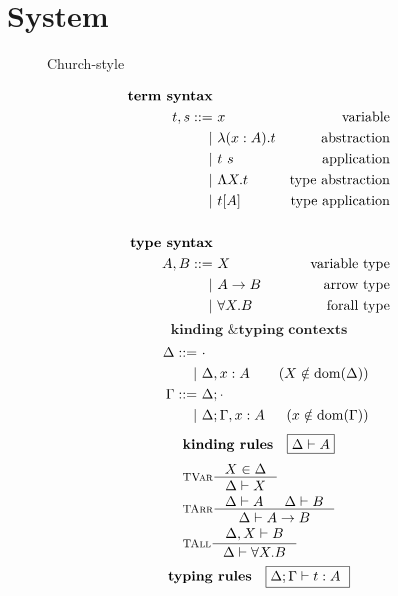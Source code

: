 \section{System \F} \label{sec:f}
\begin{figure}
\begin{singlespace}
\begin{minipage}{.46\textwidth}
	\begin{center}Church-style\end{center}
\def\baselinestretch{0}
\small
\begin{align*}
\textbf{term syntax} \\
t,s ::= &~ x           & \text{variable}    \\
      | &~ \lambda(x:A) . t & \text{abstraction} \\
      | &~ t ~ s       & \text{application} \\
      | &~ \Lambda X    . t & \text{type abstraction} \\
      | &~ t [A]       & \text{type application} \\
\\
\textbf{type syntax} \\
A,B ::= &~ X           & \text{variable type}   \\
      | &~ A -> B      & \text{arrow type} \\
      | &~ \forall X.B & \text{forall type}   \\
\end{align*}
\[ \textbf{kinding \& typing contexts} \]\vspace*{-1em}
\begin{align*}\quad
\Delta ::= &~ \cdot \\
	 | &~ \Delta, x:A & (X\notin \mathop{\mathrm{dom}}(\Delta)) \\
\Gamma ::= &~ \Delta;\cdot \\
	 | &~ \Delta;\Gamma, x:A & (x\notin \mathop{\mathrm{dom}}(\Gamma)) \\
\end{align*}
\[ \textbf{kinding rules} \quad \framebox{$ \Delta |- A $} \]\vspace*{-1em}
\begin{align*}
& \inference[\sc TVar]{X \in \Delta}{\Delta |- X} \\
& \inference[\sc TArr]{\Delta |- A & \Delta |- B}{\Delta |- A -> B} \\
& \inference[\sc TAll]{\Delta,X |- B}{\Delta |- \forall X.B} \\
\end{align*}
\[ \textbf{typing rules} \quad \framebox{$ \Delta;\Gamma |- t : A $ } \]

\end{minipage}
\end{singlespace}
\end{figure}
